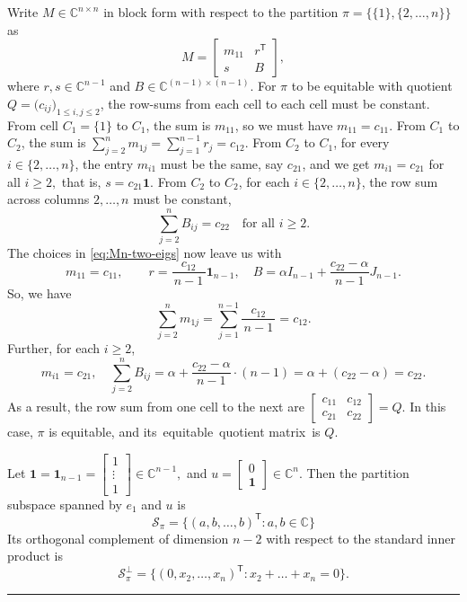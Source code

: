 \documentclass[12pt,twoside]{article}
\renewenvironment{proof}{{\noindent\bfseries Proof.}}{\qed}
\def\qed{\nolinebreak\hfill\rule{.2cm}{.2cm}\par\addvspace{.5cm}}
\begin{document}
\begin{proof}
	Write $M\in \mathbb{C}^{n\times n}$ in block form with respect to the partition $\pi=\{\{1\},\{2,\dots,n\}\}$ as
	$$
	M
	=
	\begin{bmatrix}
		m_{11} & r^\mathsf{T}\\
		s & B
	\end{bmatrix},
	$$
	where $r,s\in\mathbb{C}^{n-1}$ and $B\in\mathbb{C}^{(n-1)\times(n-1)}$. For $\pi$ to be equitable with quotient $Q=\bigl(c_{ij}\bigr)_{1\le i,j\le 2}$, the row-sums from each cell to each cell must be constant.  From cell $C_1=\{1\}$ to $C_1$, the sum is $m_{11}$, so we must have $m_{11} = c_{11}.$  From $C_1$ to $C_2$,  the sum is  $\sum_{j=2}^n m_{1j} = \sum_{j=1}^{n-1} r_j = c_{12}.$ From $C_2$ to $C_1$, for every $i\in\{2,\dots,n\}$, the entry $m_{i1}$ must be the same, say $c_{21}$, and we get  $m_{i1}=c_{21}$ for all $i\ge 2,$ that is, $s=c_{21}\mathbf{1}$.  From $C_2$ to $C_2$, for each $i\in\{2,\dots,n\}$, the row sum across columns $2,\dots,n$ must be constant,
		$$
		\sum_{j=2}^n B_{ij} = c_{22}\quad\text{for all }i\ge 2.
		$$	
	The choices in \eqref{eq:Mn-two-eigs} now leave us with
	$$
	m_{11}=c_{11},\qquad
	r=\frac{c_{12}}{\,n-1\,}\mathbf{1}_{n-1},\quad
	B = \alpha I_{n-1} + \frac{c_{22}-\alpha}{\,n-1\,}J_{n-1}.
	$$
	So, we have
	$$
	\sum_{j=2}^n m_{1j} 
	= \sum_{j=1}^{n-1}\frac{c_{12}}{\,n-1\,}
	= c_{12}.
	$$
	Further, for each $i\ge 2$, 
	$$
	m_{i1}=c_{21},\quad
	\sum_{j=2}^n B_{ij}
	= \alpha + \frac{c_{22}-\alpha}{\,n-1\,}\cdot (n-1) 
	= \alpha + (c_{22}-\alpha)
	= c_{22}.
	$$
	As a result, the row sum from one cell to the next are $\begin{bmatrix}
		c_{11} & c_{12}\\
		c_{21} & c_{22}
	\end{bmatrix}
	=Q$. In this case, $\pi$ is equitable, and its equitable quotient matrix is $Q$.
	
	 	Let $\mathbf{1}=\mathbf{1}_{n-1}=\begin{bmatrix}1\\\vdots\\1\end{bmatrix}\in\mathbb{C}^{n-1},$ and $	u =\begin{bmatrix}0\\ \mathbf{1}\end{bmatrix}\in\mathbb{C}^{n}.$ Then  the partition subspace spanned by $e_1$ and $u$ is
	$$
	\mathcal{S}_\pi=\{(a,b,\dots,b)^\mathsf{T}:a,b\in\mathbb{C}\}
	$$
	 Its orthogonal complement of dimension $n-2$ with respect to the standard inner product is
	$$
	\mathcal{S}_\pi^\perp
	=
	\{(0,x_2,\dots,x_n)^\mathsf{T} : x_2+\dots+x_n=0\}.
	$$
	

\end{proof}
\end{document}
